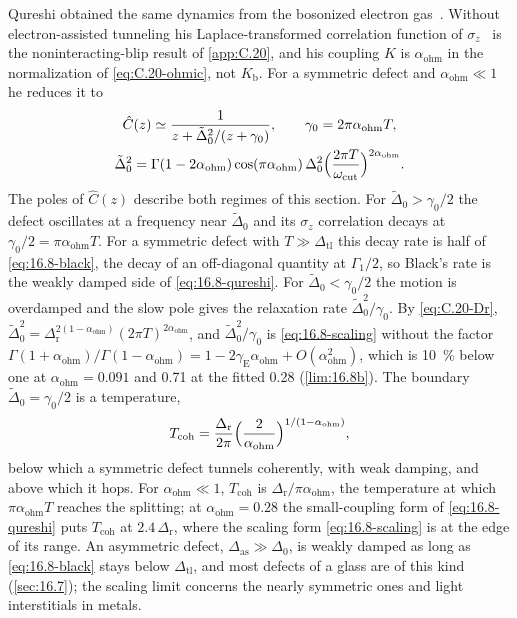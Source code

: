 Qureshi obtained the same dynamics from the bosonized electron gas~\cite{qureshi1995dynamics}. Without electron-assisted tunneling his Laplace-transformed correlation function of $\sigma_z$~\cite[Eqs.~(8), (9)]{qureshi1995dynamics} is the noninteracting-blip result of \cref{app:C.20}, and his coupling $K$ is $\alpha_{\mathrm{ohm}}$ in the normalization of \cref{eq:C.20-ohmic}, not $K_{\mathrm{b}}$. For a symmetric defect and $\alpha_{\mathrm{ohm}} \ll 1$ he reduces it to~\cite[Eq.~(10)]{qureshi1995dynamics}
\begin{equation}
  \begin{gathered}
  \hat C(z) \simeq \frac{1}{z + \tilde\Delta_0^2/(z + \gamma_0)} , \qquad \gamma_0 = 2\pi\alpha_{\mathrm{ohm}}T , \\
  \tilde\Delta_0^2 = \Gamma(1 - 2\alpha_{\mathrm{ohm}})\cos(\pi\alpha_{\mathrm{ohm}})\,\Delta_0^2\Bigl(\frac{2\pi T}{\omega_{\mathrm{cut}}}\Bigr)^{2\alpha_{\mathrm{ohm}}} .
  \end{gathered}
  \label{eq:16.8-qureshi}
\end{equation}
The poles of $\hat C(z)$ describe both regimes of this section. For $\tilde\Delta_0 > \gamma_0/2$ the defect oscillates at a frequency near $\tilde\Delta_0$ and its $\sigma_z$ correlation decays at $\gamma_0/2 = \pi\alpha_{\mathrm{ohm}}T$. For a symmetric defect with $T \gg \Delta_{\mathrm{tl}}$ this decay rate is half of \cref{eq:16.8-black}, the decay of an off-diagonal quantity at $\varGamma_1/2$, so Black's rate is the weakly damped side of \cref{eq:16.8-qureshi}. For $\tilde\Delta_0 < \gamma_0/2$ the motion is overdamped and the slow pole gives the relaxation rate $\tilde\Delta_0^2/\gamma_0$. By \cref{eq:C.20-Dr}, $\tilde\Delta_0^2 = \Delta_{\mathrm{r}}^{2(1 - \alpha_{\mathrm{ohm}})}(2\pi T)^{2\alpha_{\mathrm{ohm}}}$, and $\tilde\Delta_0^2/\gamma_0$ is \cref{eq:16.8-scaling} without the factor $\Gamma(1 + \alpha_{\mathrm{ohm}})/\Gamma(1 - \alpha_{\mathrm{ohm}}) = 1 - 2\gamma_{\mathrm{E}}\alpha_{\mathrm{ohm}} + O(\alpha_{\mathrm{ohm}}^2)$, which is \SI{10}{\percent} below one at $\alpha_{\mathrm{ohm}} = 0.091$ and 0.71 at the fitted 0.28 (\cref{lim:16.8b}). The boundary $\tilde\Delta_0 = \gamma_0/2$ is a temperature,
\begin{equation}
  T_{\mathrm{coh}} = \frac{\Delta_{\mathrm{r}}}{2\pi}\Bigl(\frac{2}{\alpha_{\mathrm{ohm}}}\Bigr)^{1/(1 - \alpha_{\mathrm{ohm}})} ,
  \label{eq:16.8-Tcoh}
\end{equation}
below which a symmetric defect tunnels coherently, with weak damping, and above which it hops. For $\alpha_{\mathrm{ohm}} \ll 1$, $T_{\mathrm{coh}}$ is $\Delta_{\mathrm{r}}/\pi\alpha_{\mathrm{ohm}}$, the temperature at which $\pi\alpha_{\mathrm{ohm}}T$ reaches the splitting; at $\alpha_{\mathrm{ohm}} = 0.28$ the small-coupling form of \cref{eq:16.8-qureshi} puts $T_{\mathrm{coh}}$ at $2.4\,\Delta_{\mathrm{r}}$, where the scaling form \cref{eq:16.8-scaling} is at the edge of its range. An asymmetric defect, $\Delta_{\mathrm{as}} \gg \Delta_0$, is weakly damped as long as \cref{eq:16.8-black} stays below $\Delta_{\mathrm{tl}}$, and most defects of a glass are of this kind (\cref{sec:16.7}); the scaling limit concerns the nearly symmetric ones and light interstitials in metals.

